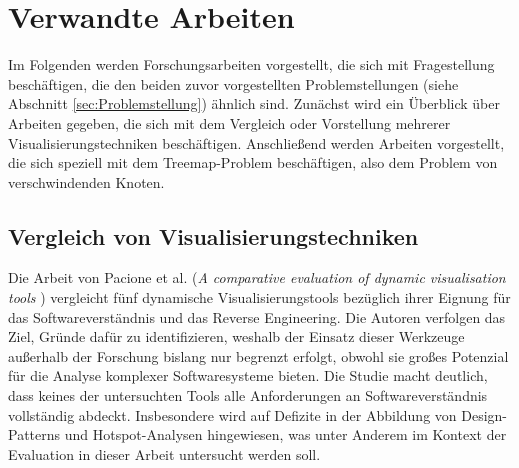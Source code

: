 \chapter{Verwandte Arbeiten} \label{sec:VerwandteArbeiten}
Im Folgenden werden Forschungsarbeiten vorgestellt, die sich mit Fragestellung beschäftigen, die den beiden zuvor vorgestellten Problemstellungen (siehe Abschnitt \ref{sec:Problemstellung}) ähnlich sind. Zunächst wird ein Überblick über Arbeiten gegeben, die sich mit dem Vergleich oder Vorstellung mehrerer Visualisierungstechniken beschäftigen. Anschließend werden Arbeiten vorgestellt, die sich speziell mit dem Treemap-Problem beschäftigen, also dem Problem von verschwindenden Knoten.

\section{Vergleich von Visualisierungstechniken} \label{sec:VergleichVisualisierungstechniken}

Die Arbeit von Pacione et al. (\textit{A comparative evaluation of dynamic visualisation tools} \cite{pacione2003comparative}) vergleicht fünf dynamische Visualisierungstools bezüglich ihrer Eignung für das Softwareverständnis und das Reverse Engineering. Die Autoren verfolgen das Ziel, Gründe dafür zu identifizieren, weshalb der Einsatz dieser Werkzeuge außerhalb der Forschung bislang nur begrenzt erfolgt, obwohl sie großes Potenzial für die Analyse komplexer Softwaresysteme bieten. Die Studie macht deutlich, dass keines der untersuchten Tools alle Anforderungen an Softwareverständnis vollständig abdeckt. Insbesondere wird auf Defizite in der Abbildung von Design-Patterns und Hotspot-Analysen hingewiesen, was unter Anderem im Kontext der Evaluation in dieser Arbeit untersucht werden soll.

